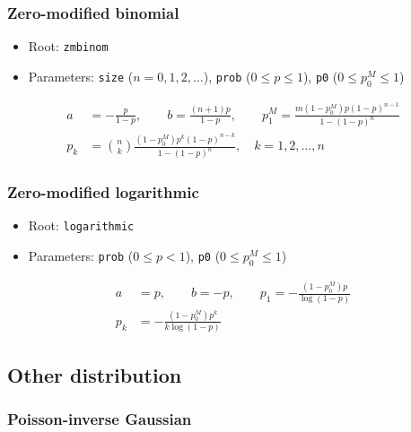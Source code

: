 \documentclass[x11names]{article}
\newcommand{\code}[1]{\texttt{#1}}
\begin{document}
\subsubsection{Zero-modified binomial}

\begin{itemize}
\item Root: \code{zmbinom}
\item Parameters: \code{size} ($n = 0, 1, 2, \dots$),
  \code{prob} ($0 \leq p \leq 1$),
  \code{p0} ($0 \leq p_0^M \leq 1$)
\end{itemize}
\begin{align*}
  a &= -\frac{p}{1 - p}, \qquad b = \frac{(n + 1)p}{1 - p}, \qquad
      p_1^M = \frac{m (1 - p_0^M) p (1 - p)^{n - 1}}{1 - (1 - p)^n} \\
  p_k &= \binom{n}{k} \frac{(1 - p_0^M) p^k (1 - p)^{n - k}}{1 - (1 - p)^n}, \quad
        k = 1, 2, \dots, n
\end{align*}

\subsubsection{Zero-modified logarithmic}

\begin{itemize}
\item Root: \code{logarithmic}
\item Parameters: \code{prob} ($0 \leq p < 1$),
  \code{p0} ($0 \leq p_0^M \leq 1$)
\end{itemize}
\begin{align*}
  a &= p, \qquad b = -p, \qquad
      p_1 = - \frac{(1 - p_0^M) p}{\log (1 - p)} \\
  p_k &= - \frac{(1 - p_0^M) p^k}{k \log (1 - p)}
\end{align*}


\subsection{Other distribution}
\label{sec:app:discrete:pig}

\subsubsection{Poisson-inverse Gaussian}
\end{document}
